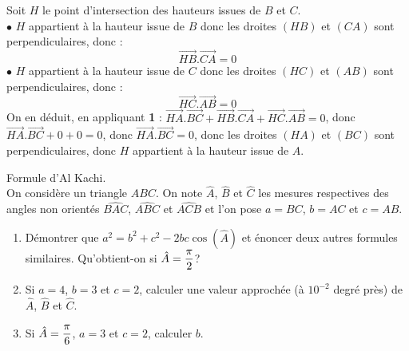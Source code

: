 \documentclass[a4paper, 11pt]{article}
\begin{document}
\begin{correction}
\begin{enumerate}
		      Soit $H$ le point d'intersection des hauteurs issues de $B$ et $C$. \\
		      $\bullet$ $H$ appartient \`a la hauteur issue de $B$ donc les droites $(HB)$ et $(CA)$ sont perpendiculaires, donc :$$\overrightarrow{HB}.\overrightarrow{CA} = 0$$
		      $\bullet$ $H$ appartient \`a la hauteur issue de $C$ donc les droites $(HC)$ et $(AB)$ sont perpendiculaires, donc :$$\overrightarrow{HC}.\overrightarrow{AB} = 0$$
		      On en d\'eduit, en appliquant {\bf 1} :
		      $\overrightarrow{HA}.\overrightarrow{BC} + \overrightarrow{HB}.\overrightarrow{CA} + \overrightarrow{HC}.\overrightarrow{AB}=0$, donc $\overrightarrow{HA}.\overrightarrow{BC} + 0+0=0$, donc $\overrightarrow{HA}.\overrightarrow{BC} = 0$, donc les droites $(HA)$ et $(BC)$ sont perpendiculaires, donc $H$ appartient \`a la hauteur issue de $A$.
	\end{enumerate}
\end{correction}
\begin{exercice}  \; Formule d'Al Kachi.\\
	On consid\`ere un triangle $ABC$. On note $\hat{A}$, $\hat{B}$ et $\hat{C}$ les mesures respectives des angles non orient\'es $\widehat{BAC}$, $\widehat{ABC}$ et $\widehat{ACB}$ et l'on pose $a=BC$, $b=AC$ et $c=AB$.
	\begin{enumerate}
		\item D\'emontrer que $a^2=b^2+c^2-2bc\cos(\hat{A})$ et \'enoncer deux autres formules similaires. Qu'obtient-on si $\hat{A} = \displaystyle\frac{\pi}{2}$?
		\item Si $a=4$, $b=3$ et $c=2$, calculer une valeur approch\'ee (\`a $10^{-2}$ degr\'e pr\`es) de $\hat{A}$, $\hat{B}$ et $\hat{C}$.
		\item Si $\hat{A} = \displaystyle\frac{\pi}{6}$, $a=3$ et $c=2$, calculer $b$.
	\end{enumerate}
\end{exercice}
\end{document}
